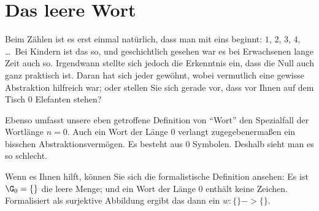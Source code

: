 \Tut\section{Das leere Wort}
\label{sec:leeres-wort}

Beim Zählen ist es erst einmal natürlich, dass man mit eins beginnt:
$1$, $2$, $3$, $4$, \dots\ Bei Kindern ist das so, und geschichtlich
gesehen war es bei Erwachsenen lange Zeit auch so. Irgendwann stellte
sich jedoch die Erkenntnis ein, dass die Null auch ganz praktisch
ist. Daran hat sich jeder gewöhnt, wobei vermutlich eine gewisse
Abstraktion hilfreich war; oder stellen Sie sich gerade vor, dass vor
Ihnen auf dem Tisch $0$ Elefanten stehen?

Ebenso umfasst unsere eben getroffene Definition von "`Wort"' den
Spezialfall der Wortlänge $n=0$. Auch ein Wort der Länge $0$ verlangt
zugegebenermaßen ein bisschen Abstraktionsvermögen. Es besteht aus $0$
Symbolen. Deshalb sieht man es so schlecht.

Wenn es Ihnen hilft, können Sie sich die formalistische Definition
ansehen: Es ist $\G_0 = \{\}$ die leere Menge; und ein Wort der Länge
$0$ enthält keine Zeichen. Formalisiert als surjektive Abbildung
ergibt das dann ein $w:\{\} -> \{\}$.

